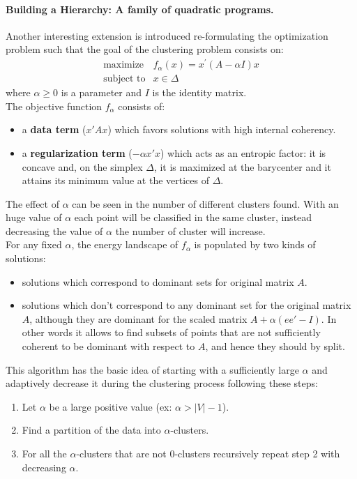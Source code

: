 \paragraph{Building a Hierarchy: A family of quadratic programs.} Another interesting extension is introduced re-formulating the optimization problem such that the goal of the clustering problem consists on:
\begin{equation}\label{alphaSPQ}
\begin{array}{lcl}
\text{maximize} & f_\alpha(x) = x^\prime(A - \alpha I)x\\
\text{subject to} & x \in \Delta
\end{array}
\end{equation}
where $\alpha \geq 0$ is a parameter and $I$ is the identity matrix.\\
The objective function $f_{\alpha}$ consists of:
\begin{itemize}
	\item a \textbf{data term} ($x'Ax$) which favors solutions with high internal coherency.
	\item a \textbf{regularization term} ($-\alpha x'x$) which acts as an entropic factor: it is concave and, on the simplex $\Delta$, it is maximized at the barycenter and it attains its minimum value at the vertices of $\Delta$.
\end{itemize}
The effect of $\alpha$ can be seen in the number of different clusters found. With an huge value of $\alpha$ each point will be classified in the same cluster, instead decreasing the value of $\alpha$ the number of cluster will increase.\\
For any fixed $\alpha$, the energy landscape of $f_{\alpha}$ is populated by two kinds of solutions:
\begin{itemize}
	\item solutions which correspond to dominant sets for original matrix $A$.
	\item solutions which don't correspond to any dominant set for the original matrix $A$, although they are dominant for the scaled matrix $A+\alpha(ee' - I)$. In other words it allows to find subsets of points that are not sufficiently coherent to be dominant with respect to $A$, and hence they should by split.	
\end{itemize}
This algorithm has the basic idea of starting with a sufficiently large $\alpha$ and adaptively decrease it during the clustering process following these steps:
\begin{enumerate}
	\item Let $\alpha$ be a large positive value (ex: $\alpha > |V|-1$).
	\item Find a partition of the data into $\alpha$-clusters.
	\item For all the $\alpha$-clusters that are not 0-clusters recursively repeat step 2 with decreasing $\alpha$.
\end{enumerate}

